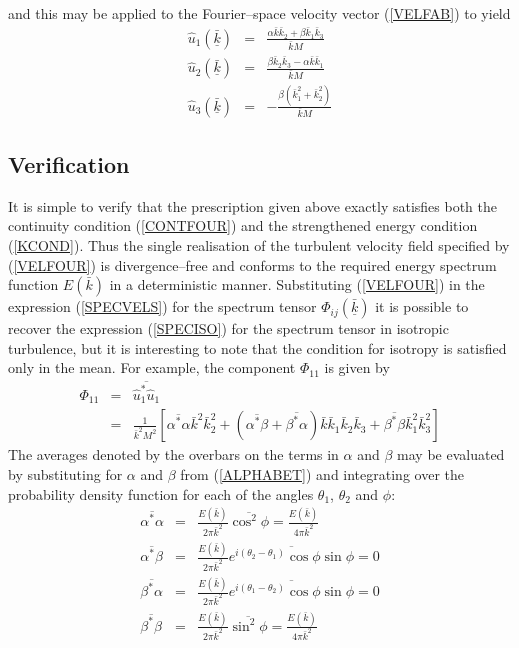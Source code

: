\documentclass[dvips]{article}
\begin{document}
and this may be applied to the Fourier--space velocity vector (\ref{VELFAB})
to yield
\begin{eqnarray}
\hat{u}_{1}(\underline{\bar{k}}) & = &
\frac{\alpha \bar{k} \bar{k}_{2} + \beta \bar{k}_{1}
\bar{k}_{3}}{\bar{k}M} \nonumber \\
\hat{u}_{2}(\underline{\bar{k}}) & = &
\frac{\beta \bar{k}_{2} \bar{k}_{3} - \alpha \bar{k}
\bar{k}_{1}}{\bar{k}M} \nonumber \\
\hat{u}_{3}(\underline{\bar{k}}) & = &
-\frac{\beta (\bar{k}_{1}^{2}+\bar{k}_{2}^{2})}{\bar{k}M}
\label{VELFOUR}
\end{eqnarray}

\subsection{Verification}
It is simple to verify that the prescription given above exactly satisfies
both the continuity condition (\ref{CONTFOUR}) and the strengthened
energy condition (\ref{KCOND}).  Thus the single realisation of the
turbulent velocity field specified by
(\ref{VELFOUR}) is divergence--free and conforms to the required energy
spectrum function $E(\bar{k})$ in a deterministic manner.  Substituting
(\ref{VELFOUR}) in the expression (\ref{SPECVELS}) for the spectrum tensor  
$\Phi_{ij}(\underline{\bar{k}})$ it is possible to recover the
expression (\ref{SPECISO}) for the spectrum tensor in isotropic turbulence,
but it is interesting to note that the condition for isotropy is satisfied only 
in the mean.  For example, the component $\Phi_{11}$ is given by
\begin{eqnarray}
\Phi_{11} & = & \overline{\hat{u}_{1}^{*}\hat{u}_{1}} \nonumber \\
& = & \frac{1}{\bar{k}^{2}M^{2}}\left[
\overline{\alpha^{*}\alpha}\bar{k}^{2}\bar{k}_{2}^{2}
+(\overline{\alpha^{*}\beta}+\overline{\beta^{*}\alpha})\bar{k}\bar{k}_{1}\bar{k}_{2}\bar{k}_{3}
+\overline{\beta^{*}\beta}\bar{k}_{1}^{2}\bar{k}_{3}^{2}
\right]
\end{eqnarray}
The averages denoted by the overbars on the terms in $\alpha$ and $\beta$
may be evaluated by substituting for
$\alpha$ and $\beta$ from (\ref{ALPHABET}) and integrating over the 
probability density function for each of the angles $\theta_{1}$, $\theta_{2}$ and $\phi$:
\begin{eqnarray}
\overline{\alpha^{*}\alpha} & = &
\frac{E(\bar{k})}{2\pi \bar{k}^{2}}\overline{\cos^{2}{\phi}} =
\frac{E(\bar{k})}{4\pi \bar{k}^{2}} \nonumber\\
\overline{\alpha^{*}\beta} & = &
\frac{E(\bar{k})}{2\pi
\bar{k}^{2}}\overline{e^{i(\theta_{2}-\theta_{1})}\cos{\phi}\sin{\phi}}
= 0 \nonumber\\
\overline{\beta^{*}\alpha} & = &
\frac{E(\bar{k})}{2\pi
\bar{k}^{2}}\overline{e^{i(\theta_{1}-\theta_{2})}\cos{\phi}\sin{\phi}}
= 0 \nonumber\\
\overline{\beta^{*}\beta} & = &
\frac{E(\bar{k})}{2\pi \bar{k}^{2}}\overline{\sin^{2}{\phi}} = \frac{E(\bar{k})}{4\pi \bar{k}^{2}}
\end{eqnarray}
\end{document}
